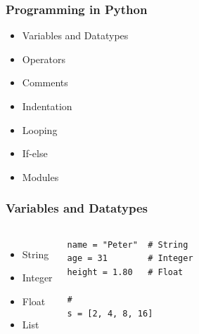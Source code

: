 \documentclass{beamer}
\begin{document}
\begin{frame}[fragile]

    \frametitle{Programming in Python}

    \begin{itemize}
        \item Variables and Datatypes
        \item Operators
        \item Comments
        \item Indentation
        \item Looping
        \item If-else
        \item Modules
    \end{itemize}

\end{frame}


\begin{frame}[fragile]

    \frametitle{Variables and Datatypes}

    \begin{columns}[t]


            \begin{itemize}
                \item String
                \item Integer
                \item Float
                \item List
            \end{itemize}


\begin{lstlisting}
name = "Peter"  # String
age = 31        # Integer
height = 1.80   # Float

# 
s = [2, 4, 8, 16]
\end{lstlisting}

    \end{columns}

\end{frame}
\end{document}
